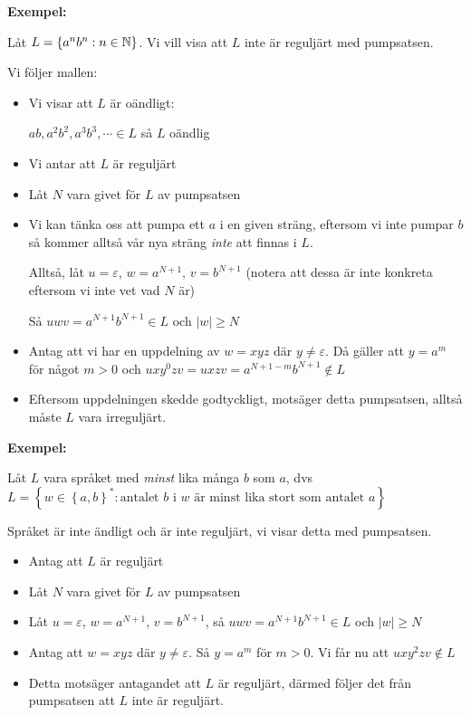 \par\bigskip
\noindent\textbf{Exempel:}\par
\noindent Låt $L = \left\{a^nb^n:n\in\mathbb{N}\right\}$. Vi vill visa att $L$ inte är reguljärt med pumpsatsen.
\par\bigskip
\noindent Vi följer mallen:
\begin{itemize}
  \item Vi visar att $L$ är oändligt:\par
    $ab, a^2b^2,a^3b^3,\cdots\in L$ så $L$ oändlig\par
  \item Vi antar att $L$ är reguljärt
  \item Låt $N$ vara givet för $L$ av pumpsatsen
  \item Vi kan tänka oss att pumpa ett $a$ i en given sträng, eftersom vi inte pumpar $b$ så kommer alltså vår nya sträng \textit{inte} att finnas i $L$.\par
    \noindent Alltså, låt $u=\varepsilon$, $w=a^{N+1}$, $v=b^{N+1}$ (notera att dessa är inte konkreta eftersom vi inte vet vad $N$ är)\par
    \noindent Så $uwv = a^{N+1}b^{N+1}\in L$ och $\left|w\right|\geq N$\par
  \item Antag att vi har en uppdelning av $w = xyz$ där $y\neq\varepsilon$. Då gäller att $y=a^m$ för något $m>0$ och $uxy^0zv=uxzv=a^{N+1-m}b^{N+1}\notin L$
  \item Eftersom uppdelningen skedde godtyckligt, motsäger detta pumpsatsen, alltså måste $L$ vara irreguljärt.  
\end{itemize}
\par\bigskip
\noindent\textbf{Exempel:}\par
\noindent Låt $L$ vara språket med \textit{minst} lika många $b$ som $a$, dvs $L = \left\{w\in\left\{a,b\right\}^*: \text{antalet $b$ i $w$ är minst lika stort som antalet $a$}\right\}$
\par\bigskip
\noindent Språket är inte ändligt och är inte reguljärt, vi visar detta med pumpsatsen. 
\begin{itemize}
  \item Antag att $L$ är reguljärt
  \item Låt $N$ vara givet för $L$ av pumpsatsen
  \item Låt $u=\varepsilon$, $w=a^{N+1}$, $v = b^{N+1}$, så $uwv = a^{N+1}b^{N+1}\in L$ och $\left|w\right|\geq N$
  \item Antag att $w=xyz$ där $y\neq\varepsilon$. Så $y=a^m$ för $m>0$. Vi får nu att $uxy^2zv\notin L$ 
  \item Detta motsäger antagandet att $L$ är reguljärt, därmed följer det från pumpsatsen att $L$ inte är reguljärt.
\end{itemize}\par

